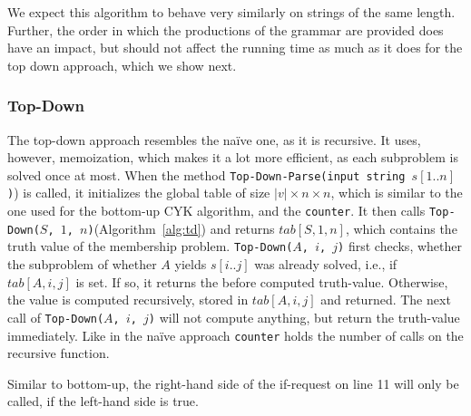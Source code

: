 We expect this algorithm to behave very similarly on strings of the same length.
Further, the order in which the productions of the grammar are provided does have an impact, but should not affect the running time as much as it does for the top down approach, which we show next.

\subsubsection{Top-Down}
\label{sec:top_down}
The top-down approach resembles the na\"{i}ve one, as it is recursive.
It uses, however, memoization, which makes it a lot more efficient, as each subproblem is solved once at most.
When the method \texttt{Top-Down-Parse(input string $s[1..n]$)}) is called, it initializes the global table of size $|v|\times n\times n$, which is similar to the one used for the bottom-up CYK algorithm, and the \texttt{counter}.
It then calls \texttt{Top-Down($S$, $1$, $n$)}(Algorithm~\ref{alg:td}) and returns $tab[S,1,n]$, which contains the truth value of the membership problem.
\texttt{Top-Down($A$, $i$, $j$)} first checks, whether the subproblem of whether $A$ yields $s[i..j]$ was already solved, i.e., if $tab[A,i,j]$ is set.
If so, it returns the before computed truth-value.
Otherwise, the value is computed recursively, stored in $tab[A,i,j]$ and returned.
The next call of \texttt{Top-Down($A$, $i$, $j$)} will not compute anything, but return the truth-value immediately.
Like in the na\"{i}ve approach \texttt{counter} holds the number of calls on the recursive function.

Similar to bottom-up, the right-hand side of the if-request on line 11 will only be called, if the left-hand side is true.

